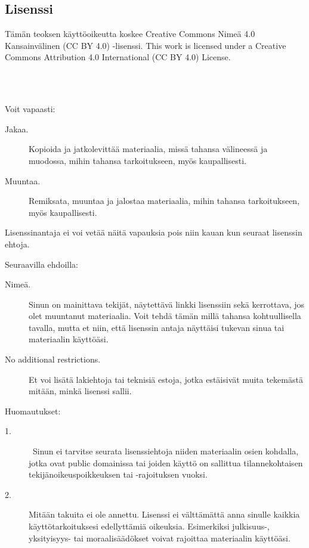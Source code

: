 \subsection*{Lisenssi}

Tämän teoksen käyttöoikeutta koskee Creative Commons Nimeä 4.0 Kansainvälinen (CC BY 4.0) -lisenssi.
This work is licensed under a Creative Commons Attribution 4.0 International (CC BY 4.0) License.

 \\
 \\

Voit vapaasti:
\begin{description}
\item[Jakaa.] Kopioida ja jatkolevittää materiaalia, missä tahansa välineessä ja muodossa, mihin tahansa tarkoitukseen, myös kaupallisesti.
\item[Muuntaa.] Remiksata, muuntaa ja jalostaa materiaalia, mihin tahansa tarkoitukseen, myös kaupallisesti.
\end{description}

Lisenssinantaja ei voi vetää näitä vapauksia pois niin kauan kun seuraat lisenssin ehtoja.

Seuraavilla ehdoilla:
\begin{description}
\item[Nimeä.] Sinun on mainittava tekijät, näytettävä linkki lisenssiin sekä kerrottava, jos olet muuntanut materiaalia. Voit tehdä tämän millä tahansa kohtuullisella tavalla, mutta et niin, että lisenssin antaja näyttäisi tukevan sinua tai materiaalin käyttöäsi.
\item[No additional restrictions.] Et voi lisätä lakiehtoja tai teknisiä estoja, jotka estäisivät muita tekemästä mitään, minkä lisenssi sallii.
\end{description}

Huomautukset:
\begin{description}
\item[1.] Sinun ei tarvitse seurata lisenssiehtoja niiden materiaalin osien kohdalla, jotka ovat public domainissa tai joiden käyttö on sallittua tilannekohtaisen tekijänoikeuspoikkeuksen tai -rajoituksen vuoksi.
\item[2.] Mitään takuita ei ole annettu. Lisenssi ei välttämättä anna sinulle kaikkia käyttötarkoituksesi edellyttämiä oikeuksia. Esimerkiksi julkisuus-, yksityisyys- tai moraalisäädökset voivat rajoittaa materiaalin käyttöäsi.
\end{description}



